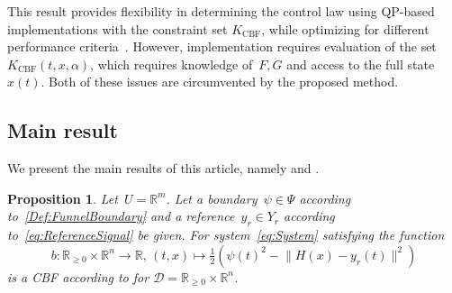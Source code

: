 \documentclass[journal,twoside,web]{ieeeconf}
\newcommand{\R}{\mathbb{R}}
\newtheorem{prop}{Proposition}
\begin{document}
This result provides flexibility in determining the control law using QP-based implementations with the constraint set $K_{\mathrm{CBF}}$, while optimizing for different performance criteria~\cite{ames2019control}.  
However, implementation requires evaluation of the set $K_{\mathrm{CBF}}(t,x,\alpha)$, which 
requires knowledge of~$F,G$ and access to the full state~$x(t)$. Both of these issues are circumvented by the proposed method.



%
\subsection{Main result}
We present the main results of this article, namely  and .
\begin{prop} \label{prop:bFCisCBF}
Let~$U = \R^m$. Let a boundary~${\psi \in \Psi}$ according to~\eqref{Def:FunnelBoundary}
    and a reference~$y_r \in Y_r$ according to~\eqref{eq:ReferenceSignal} be given.
For system~\eqref{eq:System} satisfying  the function
\begin{equation} \label{eq:CBF}
    b: \R_{\ge 0} \!\times\! \R^n \!\to\! \R, \,(t,x) \!\mapsto\! \tfrac{1}{2} \! \left(\psi(t)^2 \!-\! \|H(x)\!-\!y_r(t)\|^2 \right)
\end{equation}
is a CBF according to  for $\mathcal{D} = \R_{\ge 0} \times  \R^n$.
\end{prop}
\end{document}
